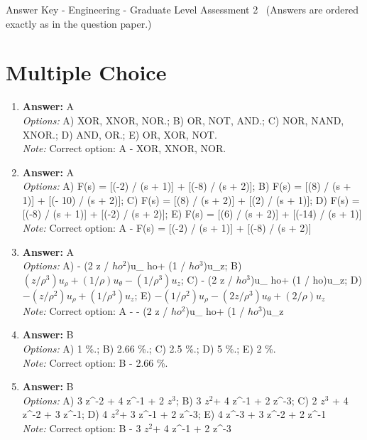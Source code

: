 \documentclass[12pt]{article}
\begin{document}
\begin{center}
Answer Key - Engineering - Graduate Level Assessment 2 \
\small (Answers are ordered exactly as in the question paper.)
\end{center}

\section*{Multiple Choice}
\begin{enumerate}[label=\arabic*.]
\item \textbf{Answer:} A
\\ \textit{Options:} A) XOR, XNOR, NOR.; B) OR, NOT, AND.; C) NOR, NAND, XNOR.; D) AND, OR.; E) OR, XOR, NOT.
\\ \textit{Note:} Correct option: A - XOR, XNOR, NOR.
\item \textbf{Answer:} A
\\ \textit{Options:} A) F(s) = [(-2) / (s + 1)] + [(-8) / (s + 2)]; B) F(s) = [(8) / (s + 1)] + [(- 10) / (s + 2)]; C) F(s) = [(8) / (s + 2)] + [(2) / (s + 1)]; D) F(s) = [(-8) / (s + 1)] + [(-2) / (s + 2)]; E) F(s) = [(6) / (s + 2)] + [(-14) / (s + 1)]
\\ \textit{Note:} Correct option: A - F(s) = [(-2) / (s + 1)] + [(-8) / (s + 2)]
\item \textbf{Answer:} A
\\ \textit{Options:} A) - (2 z / $ho^2$)u\_ ho+ (1 / $ho^3$)u\_z; B) \( (z / \rho^3)u_\rho + (1 / \rho)u_\theta - (1 / \rho^3)u_z \); C) - (2 z / $ho^3$)u\_ ho+ (1 / ho)u\_z; D) \( - (z / \rho^2)u_\rho + (1 / \rho^3)u_z \); E) \( - (1 / \rho^2)u_\rho - (2 z / \rho^3)u_\theta + (2 / \rho)u_z \)
\\ \textit{Note:} Correct option: A - - (2 z / $ho^2$)u\_ ho+ (1 / $ho^3$)u\_z
\item \textbf{Answer:} B
\\ \textit{Options:} A) 1 \%.; B) 2.66 \%.; C) 2.5 \%.; D) 5 \%.; E) 2 \%.
\\ \textit{Note:} Correct option: B - 2.66 \%.
\item \textbf{Answer:} B
\\ \textit{Options:} A) 3 z^-2 + 4 z^-1 + 2 $z^3$; B) 3 $z^2$+ 4 z^-1 + 2 z^-3; C) 2 $z^3$ + 4 z^-2 + 3 z^-1; D) 4 $z^2$+ 3 z^-1 + 2 z^-3; E) 4 z^-3 + 3 z^-2 + 2 z^-1
\\ \textit{Note:} Correct option: B - 3 $z^2$+ 4 z^-1 + 2 z^-3
\end{enumerate}
\end{document}
